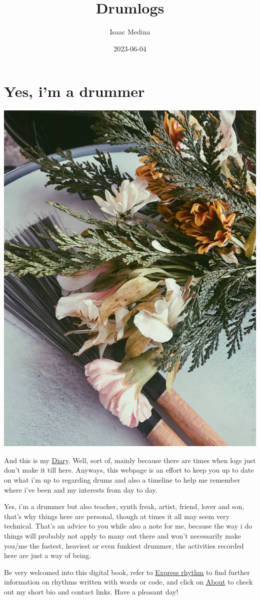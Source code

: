 \documentclass[
]{book}
\title{Drumlogs}
\author{Isaac Medina}
\date{2023-06-04}
\begin{document}
\maketitle

{
\setcounter{tocdepth}{1}
\tableofcontents
}
\hypertarget{yes-im-a-drummer}{%
\chapter*{Yes, i'm a drummer}\label{yes-im-a-drummer}}

\includegraphics[width=0.6\linewidth]{images/flowerBrush1}

And this is my \protect\hyperlink{Diary}{Diary}. Well, sort of, mainly because there are times when logs just don't make it till here. Anyways, this webpage is an effort to keep you up to date on what i'm up to regarding drums and also a timeline to help me remember where i've been and my interests from day to day.

Yes, i'm a drummer but also teacher, synth freak, artist, friend, lover and son, that's why things here are personal, though at times it all may seem very technical. That's an advice to you while also a note for me, because the way i do things will probably not apply to many out there and won't necessarily make you/me the fastest, heaviest or even funkiest drummer, the activities recorded here are just a way of being.

Be very welcomed into this digital book, refer to \protect\hyperlink{Express-rhythm}{Express rhythm} to find further information on rhythms written with words or code, and click on \protect\hyperlink{About}{About} to check out my short bio and contact links. Have a pleasant day!
\end{document}
